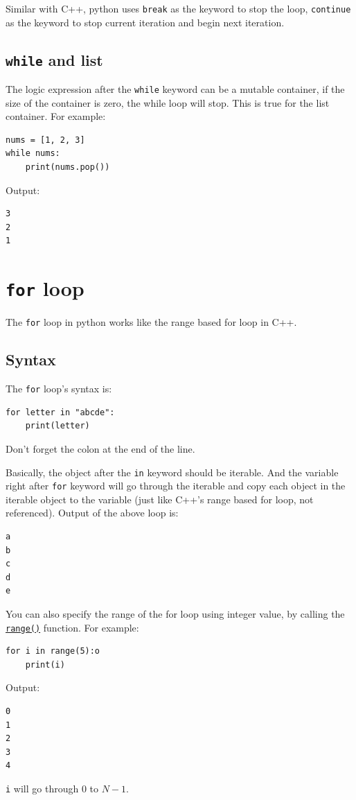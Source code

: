 \documentclass[12pt]{book}
\begin{document}
Similar with C++, python uses \texttt{break} as the keyword to stop the loop, \texttt{continue} as the keyword to stop current iteration and begin next iteration.
\subsection{\texttt{while} and list}
\label{sec:orge45a0c1}
The logic expression after the \texttt{while} keyword can be a mutable container, if the size of the container is zero, the while loop will stop. This is true for the list container. For example:
\begin{verbatim}
nums = [1, 2, 3]
while nums:
    print(nums.pop())   
\end{verbatim}
Output:
\begin{verbatim}
3
2
1
\end{verbatim}

\section{\texttt{for} loop}
\label{sec:org5acdb46}
The \texttt{for} loop in python works like the range based for loop in C++. 
\subsection{Syntax}
\label{sec:orga751e14}
The \texttt{for} loop's syntax is:
\begin{verbatim}
for letter in "abcde":
    print(letter)
\end{verbatim}
Don't forget the colon at the end of the line.

Basically, the object after the \texttt{in} keyword should be iterable. And the variable right after \texttt{for} keyword will go through the iterable and copy each object in the iterable object to the variable (just like C++'s range based for loop, not referenced). Output of the above loop is:
\begin{verbatim}
a
b
c
d
e
\end{verbatim}

You can also specify the range of the for loop using integer value, by calling the \href{https://docs.python.org/3/library/stdtypes.html\#range}{\texttt{range()}} function. For example:
\begin{verbatim}
for i in range(5):o
    print(i)
\end{verbatim}
Output:
\begin{verbatim}
0
1
2
3
4
\end{verbatim}
\texttt{i} will go through \(0\) to \(N - 1\).
\end{document}
